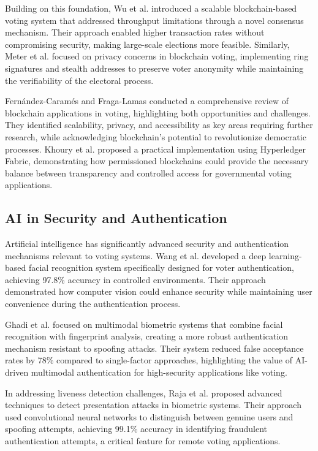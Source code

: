 \documentclass[conference]{IEEEtran}
\begin{document}
Building on this foundation, Wu et al. \cite{b7} introduced a scalable blockchain-based voting system that addressed throughput limitations through a novel consensus mechanism. Their approach enabled higher transaction rates without compromising security, making large-scale elections more feasible. Similarly, Meter et al. \cite{b8} focused on privacy concerns in blockchain voting, implementing ring signatures and stealth addresses to preserve voter anonymity while maintaining the verifiability of the electoral process.

Fernández-Caramés and Fraga-Lamas \cite{b9} conducted a comprehensive review of blockchain applications in voting, highlighting both opportunities and challenges. They identified scalability, privacy, and accessibility as key areas requiring further research, while acknowledging blockchain's potential to revolutionize democratic processes. Khoury et al. \cite{b10} proposed a practical implementation using Hyperledger Fabric, demonstrating how permissioned blockchains could provide the necessary balance between transparency and controlled access for governmental voting applications.

\subsection{AI in Security and Authentication}
Artificial intelligence has significantly advanced security and authentication mechanisms relevant to voting systems. Wang et al. \cite{b11} developed a deep learning-based facial recognition system specifically designed for voter authentication, achieving 97.8\% accuracy in controlled environments. Their approach demonstrated how computer vision could enhance security while maintaining user convenience during the authentication process.

Ghadi et al. \cite{b12} focused on multimodal biometric systems that combine facial recognition with fingerprint analysis, creating a more robust authentication mechanism resistant to spoofing attacks. Their system reduced false acceptance rates by 78\% compared to single-factor approaches, highlighting the value of AI-driven multimodal authentication for high-security applications like voting.

In addressing liveness detection challenges, Raja et al. \cite{b13} proposed advanced techniques to detect presentation attacks in biometric systems. Their approach used convolutional neural networks to distinguish between genuine users and spoofing attempts, achieving 99.1\% accuracy in identifying fraudulent authentication attempts, a critical feature for remote voting applications.
\end{document}
